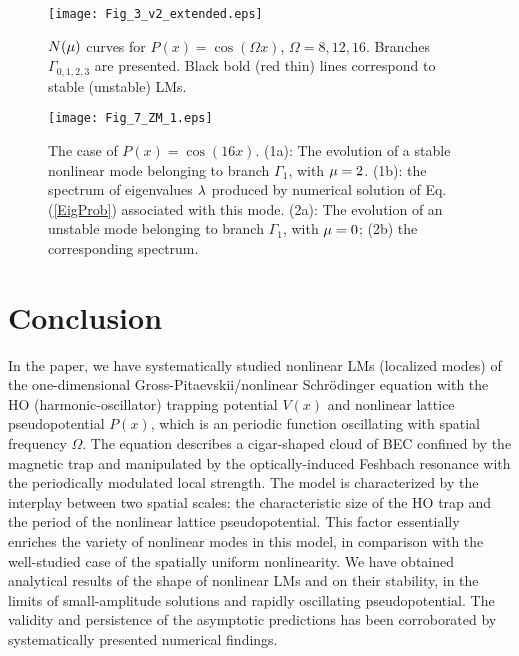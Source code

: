 \documentclass[aps,preprint,showkeys,
]{revtex4}
\begin{document}
\begin{figure}[tbp]
\texttt{[image: Fig\_3\_v2\_extended.eps]}%
\caption{$N(\protect\mu )$ curves for $P(x)=\cos \left( \Omega x\right) $, $%
\Omega =8,12,16$. Branches $\Gamma _{0,1,2,3}$ are presented. Black bold
(red thin) lines correspond to stable (unstable) LMs.}
\label{Fig_ZM_branches}
\end{figure}


\begin{figure}[tbp]
\texttt{[image: Fig\_7\_ZM\_1.eps]}%
\caption{The case of $P(x)=\cos \left( 16x\right) $. (1a): The evolution of
a stable nonlinear mode belonging to branch $\Gamma _{1}$, with $\protect\mu %
=2$. (1b): the spectrum of eigenvalues $\protect\lambda $ produced by
numerical solution of Eq. (\protect\ref{EigProb}) associated with this mode.
(2a): The evolution of an unstable mode belonging to branch $\Gamma _{1}$,
with $\protect\mu =0$; (2b) the corresponding spectrum. }
\label{Fig_Comp_ZM}
\end{figure}

\section{Conclusion}

\label{Concl}

In the paper, we have systematically studied nonlinear LMs (localized modes)
of the one-dimensional Gross-Pitaevskii/nonlinear Schr\"{o}dinger equation
with the HO (harmonic-oscillator) trapping potential $V(x)$ and nonlinear
lattice pseudopotential $P(x)$, which is an periodic function oscillating
with spatial frequency $\Omega $. %
The equation describes a cigar-shaped cloud of BEC confined by the magnetic
trap and manipulated by the optically-induced Feshbach resonance with the
periodically modulated local strength. The model is characterized by the
interplay between two spatial scales: the characteristic size of the HO trap
and the period of the nonlinear lattice pseudopotential. This factor
essentially enriches the variety of nonlinear modes in this model, in
comparison with the well-studied case of the spatially uniform nonlinearity.
We have obtained analytical results of the shape of nonlinear LMs and on
their stability, in the limits of small-amplitude solutions and rapidly
oscillating pseudopotential. The validity and persistence of the asymptotic
predictions has been corroborated by systematically presented numerical
findings.
\end{document}
